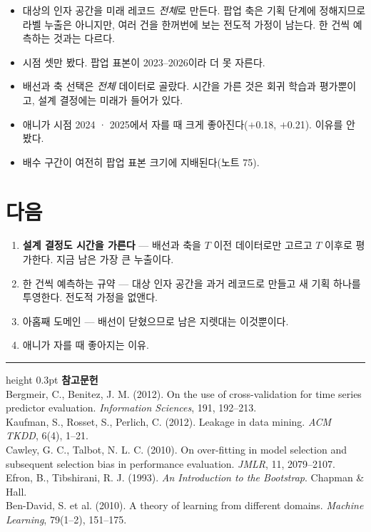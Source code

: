 \documentclass[10pt]{article}
\begin{document}
\begin{itemize}[leftmargin=1.1em,itemsep=0.15em]
\item 대상의 인자 공간을 미래 레코드 \emph{전체}로 만든다. 팝업 축은 기획
      단계에 정해지므로 라벨 누출은 아니지만, 여러 건을 한꺼번에 보는
      전도적 가정이 남는다. 한 건씩 예측하는 것과는 다르다.
\item 시점 셋만 봤다. 팝업 표본이 2023--2026이라 더 못 자른다.
\item 배선과 축 선택은 \emph{전체} 데이터로 골랐다. 시간을 가른 것은 회귀
      학습과 평가뿐이고, 설계 결정에는 미래가 들어가 있다.
\item 애니가 시점 2024 · 2025에서 자를 때 크게 좋아진다($+$0.18, $+$0.21).
      이유를 안 봤다.
\item 배수 구간이 여전히 팝업 표본 크기에 지배된다(노트 75).
\end{itemize}

\section{다음}

\begin{enumerate}[leftmargin=1.3em,itemsep=0.15em]
\item \textbf{설계 결정도 시간을 가른다} --- 배선과 축을 $T$ 이전 데이터로만
      고르고 $T$ 이후로 평가한다. 지금 남은 가장 큰 누출이다.
\item 한 건씩 예측하는 규약 --- 대상 인자 공간을 과거 레코드로 만들고 새 기획
      하나를 투영한다. 전도적 가정을 없앤다.
\item 아홉째 도메인 --- 배선이 닫혔으므로 남은 지렛대는 이것뿐이다.
\item 애니가 자를 때 좋아지는 이유.
\end{enumerate}

\vspace{0.6em}
\hrule height 0.3pt
\vspace{0.5em}
{\footnotesize
\textbf{참고문헌}\\[0.3em]
Bergmeir, C., Benitez, J. M. (2012). On the use of cross-validation for time
series predictor evaluation. \emph{Information Sciences}, 191, 192--213.\\[0.15em]
Kaufman, S., Rosset, S., Perlich, C. (2012). Leakage in data mining.
\emph{ACM TKDD}, 6(4), 1--21.\\[0.15em]
Cawley, G. C., Talbot, N. L. C. (2010). On over-fitting in model selection and
subsequent selection bias in performance evaluation. \emph{JMLR}, 11, 2079--2107.\\[0.15em]
Efron, B., Tibshirani, R. J. (1993). \emph{An Introduction to the Bootstrap}.
Chapman \& Hall.\\[0.15em]
Ben-David, S. et al. (2010). A theory of learning from different domains.
\emph{Machine Learning}, 79(1--2), 151--175.
}
\end{document}
